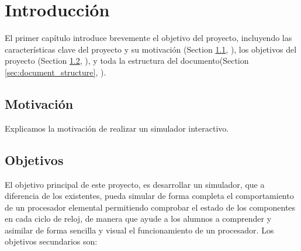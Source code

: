 \chead[]{}
\renewcommand{\headrulewidth}{0.5pt}

\lfoot[]{}
\cfoot[]{}
\rfoot[]{}
\renewcommand{\footrulewidth}{0pt}

\chapter{Introducción}
\label{ch:introduction}

El primer capítulo introduce brevemente el objetivo del proyecto, incluyendo las características clave del proyecto y su motivación (Section \ref{sec:background_and_motivation}, \textit{}), los objetivos del proyecto (Section \ref{sec:objectives}, \textit{}), y toda la estructura del documento(Section \ref{sec:document_structure}, \textit{}).

\section{Motivación}
\label{sec:background_and_motivation}
Explicamos la motivación de realizar un simulador interactivo.



\section{Objetivos}
\label{sec:objectives}

El objetivo principal de este proyecto, es desarrollar un simulador, que a diferencia de los existentes, pueda simular de forma completa el comportamiento de un procesador elemental permitiendo comprobar el estado de los componentes en cada ciclo de reloj, de manera que ayude a los alumnos a comprender y asimilar de forma sencilla y visual el funcionamiento de un procesador. Los objetivos secundarios son:

